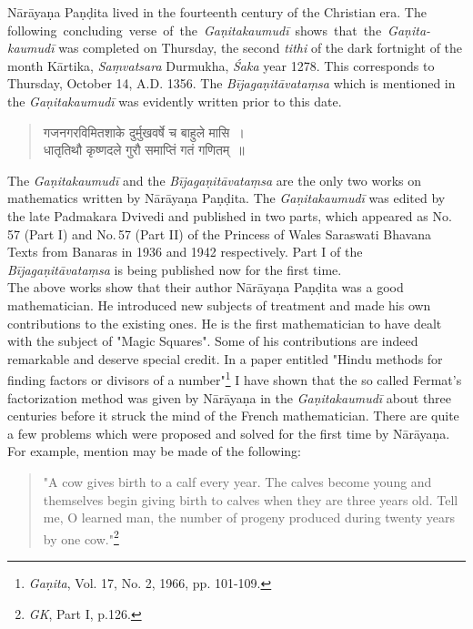 \documentclass[11pt, openany]{book}
\begin{document}
Nārāyaṇa Paṇḍita lived in the fourteenth century of
the Christian era. The following \,concluding \,verse \,of \,the \,\textit{Gaṇitakaumudī} \,shows \,that \,the \,\textit{Gaṇita-kaumudī} was completed on Thursday, the second \textit{tithi} of the dark fortnight of the month Kārtika, \textit{Saṃvatsara} Durmukha, \textit{Śaka} year 1278. This corresponds to Thursday, October 14, A.D. 1356. The \textit{Bījagaṇitāvataṃsa} which is mentioned in the \textit{Gaṇitakaumudī} was evidently written prior to this date.

\begin{quote}
{\color{violet}गजनगरविमितशाके दुर्मुखवर्षे च बाहुले मासि~।\\
धातृतिथौ कृष्णदले गुरौ समाप्तिं गतं गणितम्~॥}
\end{quote}
\vspace{12mm}

\newpage
The \textit{Gaṇitakaumudī} and the \textit{Bījagaṇitāvataṃsa} are the only two works on mathematics written by Nārāyaṇa Paṇḍita. The \textit{Gaṇitakaumudī} was edited by the late Padmakara Dvivedi and published in two parts, which appeared as No.\,57 (Part I) and No.\,57 (Part II) of the Princess of Wales Saraswati Bhavana Texts from Banaras in 1936 and 1942 respectively. Part I of the \textit{Bījagaṇitāvataṃsa} is being published now for the first time.\\

The above works show that their author Nārāyaṇa Paṇḍita was a good mathematician. He introduced new subjects of treatment and made his own contributions to the existing ones. He is the first mathematician to have dealt with the subject of "Magic Squares". Some  of his contributions are indeed remarkable and deserve special credit. In a paper entitled "Hindu methods for finding factors or divisors of a number"\footnote{\textit{Gaṇita}, Vol. 17, No. 2, 1966, pp. 101-109.} I have shown that the so called Fermat's factorization method was given by Nārāyaṇa in the \textit{Gaṇitakaumudī} about three centuries before it struck the mind of the French mathematician. There are quite a few problems which were proposed and solved for the first time by Nārāyaṇa. For example, mention may be made of the following:

\begin{quote}
{\color{violet}"A cow gives birth to a calf every year. The calves become young and themselves begin giving birth to calves when they are three years old. Tell me, O learned man, the number of progeny produced during twenty years by one cow."\footnote{\textit{GK}, Part I, p.126.}}
\end{quote}
\end{document}
